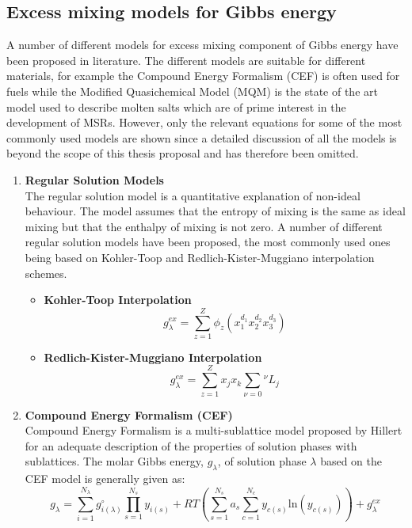 	\subsection{Excess mixing models for Gibbs energy}
	A number of different models for excess mixing component of Gibbs energy have been proposed in literature. The different models are suitable for different materials, for example the Compound Energy Formalism (CEF) is often used for  fuels while the Modified Quasichemical Model (MQM) is the state of the art model used to describe molten salts which are of prime interest in the development of MSRs. However, only the relevant equations for some of the most commonly used models are shown since a detailed discussion of all the models is beyond the scope of this thesis proposal and has therefore been omitted.
	\begin{enumerate}
	\item \textbf{Regular Solution Models}\\
	The regular solution model is a quantitative explanation of non-ideal behaviour. The model assumes that the entropy of mixing is the same as ideal mixing but that the enthalpy of mixing is not zero. A number of different regular solution models have been proposed, the most commonly used ones being based on Kohler-Toop and Redlich-Kister-Muggiano interpolation schemes.
		\begin{itemize}
			\item \textbf{Kohler-Toop Interpolation}
			\begin{equation}
				g_{\lambda}^{ex} = \sum_{z=1}^Z \phi_z (x_1^{d_1} x_2^{d_2} x_3^{d_3} )
			\end{equation}
			\item \textbf{Redlich-Kister-Muggiano Interpolation}
			\begin{equation}
				g_{\lambda}^{ex} = \sum_{z=1}^Z x_j x_k \sum_{\nu = 0} {^\nu}L_{j}
			\end{equation}
			\end{itemize}
	\item \textbf{Compound Energy Formalism (CEF)} \\
	Compound Energy Formalism is a multi-sublattice model proposed by Hillert \cite{Hillert01} for an adequate description of the properties of solution phases with sublattices. The molar Gibbs energy, $g_{\lambda}$, of solution phase $\lambda$ based on the CEF model is generally given as:
	\begin{equation}\label{eq:g_lambda}
	g_{\lambda} = \sum_{i=1}^{N_{\lambda}} g_{i(\lambda)}^{\circ} \prod _{s=1}^{N_s} y_{i(s)} + RT\left( \sum_{s=1}^{N_s} a_s \sum_{c=1}^{N_c}   y_{c(s)} \mathrm{ln} (y_{c(s)}) \right) + g_{\lambda}^{ex}

\end{equation}
\end{enumerate}
